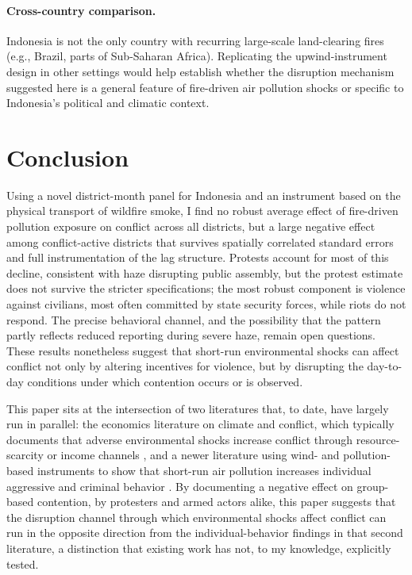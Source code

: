 \documentclass[12pt]{article}
\begin{document}
\paragraph{Cross-country comparison.} Indonesia is not the only country with recurring large-scale land-clearing fires (e.g., Brazil, parts of Sub-Saharan Africa). Replicating the upwind-instrument design in other settings would help establish whether the disruption mechanism suggested here is a general feature of fire-driven air pollution shocks or specific to Indonesia's political and climatic context.

\section{Conclusion}
\label{sec:conclusion}

Using a novel district-month panel for Indonesia and an instrument based on the physical transport of wildfire smoke, I find no robust average effect of fire-driven pollution exposure on conflict across all districts, but a large negative effect among conflict-active districts that survives spatially correlated standard errors and full instrumentation of the lag structure. Protests account for most of this decline, consistent with haze disrupting public assembly, but the protest estimate does not survive the stricter specifications; the most robust component is violence against civilians, most often committed by state security forces, while riots do not respond. The precise behavioral channel, and the possibility that the pattern partly reflects reduced reporting during severe haze, remain open questions. These results nonetheless suggest that short-run environmental shocks can affect conflict not only by altering incentives for violence, but by disrupting the day-to-day conditions under which contention occurs or is observed.

This paper sits at the intersection of two literatures that, to date, have largely run in parallel: the economics literature on climate and conflict, which typically documents that adverse environmental shocks increase conflict through resource-scarcity or income channels \citep{hsiang2013quantifying,burkehsiangmiguel2015}, and a newer literature using wind- and pollution-based instruments to show that short-run air pollution increases individual aggressive and criminal behavior \citep{herrnstadt2021,bondyrothsager2020,burkhardt2019}. By documenting a negative effect on group-based contention, by protesters and armed actors alike, this paper suggests that the disruption channel through which environmental shocks affect conflict can run in the opposite direction from the individual-behavior findings in that second literature, a distinction that existing work has not, to my knowledge, explicitly tested.
\end{document}
